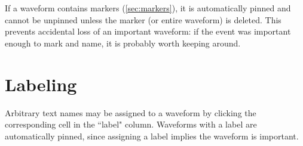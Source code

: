If a waveform contains markers (\ref{sec:markers}), it is automatically pinned and cannot be unpinned unless the
marker (or entire waveform) is deleted. This prevents accidental loss of an important waveform: if the event was
important enough to mark and name, it is probably worth keeping around.

\section{Labeling}

Arbitrary text names may be assigned to a waveform by clicking the corresponding cell in the ``label" column.
Waveforms with a label are automatically pinned, since assigning a label implies the waveform is important.

